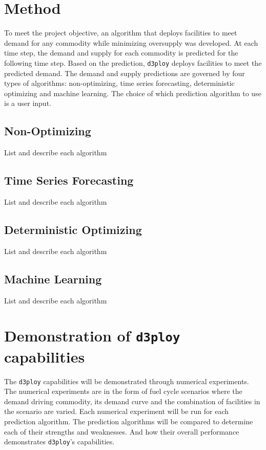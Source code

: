 \documentclass[11pt,letterpaper]{article}
\newcommand{\deploy}{\texttt{d3ploy}\xspace}%
\begin{document}
\section{Method}
To meet the project objective, an algorithm that deploys 
facilities to meet demand for any commodity while 
minimizing oversupply was developed. 
At each time step, the demand and supply for each commodity is 
predicted for the following time step. 
Based on the prediction, \deploy deploys facilities to meet the 
predicted demand. 
The demand and supply predictions are governed by four types
of algorithms: non-optimizing, time series forecasting, 
deterministic optimizing and machine learning. 
The choice of which prediction algorithm to use is a user input. 

\subsection{Non-Optimizing}
List and describe each algorithm 

\subsection{Time Series Forecasting}
List and describe each algorithm 

\subsection{Deterministic Optimizing}
List and describe each algorithm 

\subsection{Machine Learning}
List and describe each algorithm 

\section{Demonstration of \deploy capabilities}
The \deploy capabilities will be demonstrated through numerical
experiments. 
The numerical experiments are in the form of fuel cycle scenarios 
where the demand driving commodity, its demand curve and the 
combination of facilities in the scenario are varied. 
Each numerical experiment will be run for each prediction
algorithm. 
The prediction algorithms will be compared to determine each 
of their strengths and weaknesses. 
And how their overall performance demonstrates \deploy's 
capabilities. 
\end{document}
